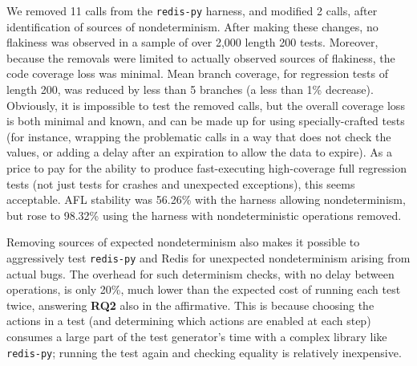 {

We removed 11 calls from the {\tt redis-py} harness, and  modified 2
calls, after
identification of sources of nondeterminism.  After making these changes, no flakiness was observed in a sample of over 2,000 length
200 tests.   Moreover, because the removals were limited to actually
observed sources of flakiness, the code coverage loss was minimal.
Mean branch coverage, for regression tests of length 200, was reduced
by less than 5 branches (a less than 1\% decrease).  Obviously, it is
impossible to test the removed calls, but the overall coverage loss is
both minimal and known, and can be made up for using specially-crafted
tests (for instance, wrapping the problematic calls in a way that does
not check the values, or adding a delay after an expiration to allow
the data to expire).  As a price to pay for the ability to produce
fast-executing high-coverage full regression tests (not just tests for
crashes and unexpected exceptions), this seems acceptable.  AFL stability was 56.26\% with the harness allowing 
nondeterminism, but rose to 98.32\% using the harness with 
nondeterministic operations removed.

Removing sources of expected nondeterminism also makes
it possible to aggressively test {\tt redis-py} and Redis for
unexpected nondeterminism arising from actual bugs.  The overhead for such
determinism checks, with no delay between operations, is only
20\%, much lower than the expected cost of running each test twice,
answering {\bf RQ2} also in the affirmative.  This is because choosing the actions in a test (and determining which
actions are enabled at each step) consumes a large part of the test
generator's time with a complex library like {\tt redis-py}; running the test again and checking equality is
relatively inexpensive.   

}
